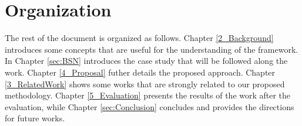 \section{Organization}
The rest of the document is organized as follows. Chapter \ref{2_Background} introduces some concepts that are useful for the understanding of the framework. In Chapter \ref{sec:BSN} introduces the case study that will be followed along the work. Chapter \ref{4_Proposal} futher details the proposed approach. Chapter \ref{3_RelatedWork} shows some works that are strongly related to our proposed methodology. Chapter \ref{5_Evaluation} presents the results of the work after the evaluation, while Chapter \ref{sec:Conclusion} concludes and provides the directions for future works.
